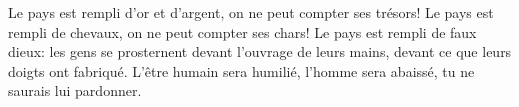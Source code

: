 Le pays est rempli d’or et d’argent, on ne peut compter ses trésors!
	Le pays est rempli de chevaux, on ne peut compter ses chars!
Le pays est rempli de faux dieux:
	les gens se prosternent devant l’ouvrage de leurs mains,
	devant ce que leurs doigts ont fabriqué.
L’être humain sera humilié, l’homme sera abaissé,
	tu ne saurais lui pardonner.
